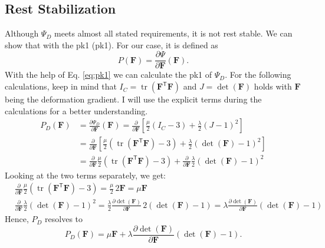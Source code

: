 {{{\subsection{Rest Stabilization}
Although $\Psi_{D}$ meets almost all stated requirements, it is not rest stable. We can show that with the \acrlong{pk1} (\acrshort{pk1}). For our case, it is defined as
\begin{equation}\label{eq:pk1}
P(\mathbf{F}) = \frac{\partial \Psi}{\partial \mathbf{F}} (\mathbf{F}).
\end{equation}
With the help of Eq. \eqref{eq:pk1} we can calculate the \acrshort{pk1} of $\Psi_{D}$. For the following calculations, keep in mind that $I_{C} = \operatorname{tr}(\mathbf{F}^\mathsf{T} \mathbf{F})$ and $J = \operatorname{det}(\mathbf{F})$ holds with $\mathbf{F}$ being the deformation gradient. I will use the explicit terms during the calculations for a better understanding.
\begin{align*}
P_{D}(\mathbf{F}) &= \frac{\partial \Psi_{D}}{\partial \mathbf{F}} (\mathbf{F}) = \frac{\partial}{\partial \mathbf{F}} \left[ \frac{\mu}{2}\left(I_{C}-3\right) +\frac{\lambda}{2}(J-1)^{2} \right] \\
&= \frac{\partial}{\partial \mathbf{F}} \left[ \frac{\mu}{2}\left(\operatorname{tr}(\mathbf{F}^\mathsf{T} \mathbf{F})-3\right) +\frac{\lambda}{2}(\operatorname{det}(\mathbf{F})-1)^{2} \right] \\
&= \frac{\partial}{\partial \mathbf{F}}  \frac{\mu}{2}\left(\operatorname{tr}(\mathbf{F}^\mathsf{T} \mathbf{F})-3\right) +\frac{\partial}{\partial \mathbf{F}} \frac{\lambda}{2}(\operatorname{det}(\mathbf{F})-1)^{2}
\end{align*}
Looking at the two terms separately, we get:
\begin{align*}
&\frac{\partial}{\partial \mathbf{F}} \frac{\mu}{2} (\operatorname{tr}(\mathbf{F}^\mathsf{T} \mathbf{F}) - 3) = \frac{\mu}{2} \, 2 \mathbf{F} = \mu \mathbf{F}
\\
&\frac{\partial}{\partial \mathbf{F}} \frac{\lambda}{2} (\operatorname{det}(\mathbf{F})-1)^{2} = \frac{\lambda}{2} \frac{\partial \operatorname{det}(\mathbf{F})}{\partial \mathbf{F}} \, 2 (\operatorname{det}(\mathbf{F}) - 1) = \lambda \frac{\partial \operatorname{det}(\mathbf{F})}{\partial \mathbf{F}}(\operatorname{det}(\mathbf{F})-1)
\end{align*}
Hence, $P_{D}$ resolves to
\[
P_{D}(\mathbf{F}) = \mu \mathbf{F} + \lambda \frac{\partial \operatorname{det}(\mathbf{F})}{\partial \mathbf{F}}(\operatorname{det}(\mathbf{F})-1).
\]}}}
